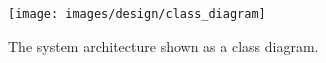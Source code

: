 
\begin{figure}[H]
	\centering
    \texttt{[image: images/design/class\_diagram]}
    \caption[Class diagram]{The system architecture shown as a class diagram.}
    \label{fig:class_diagram}
\end{figure}
